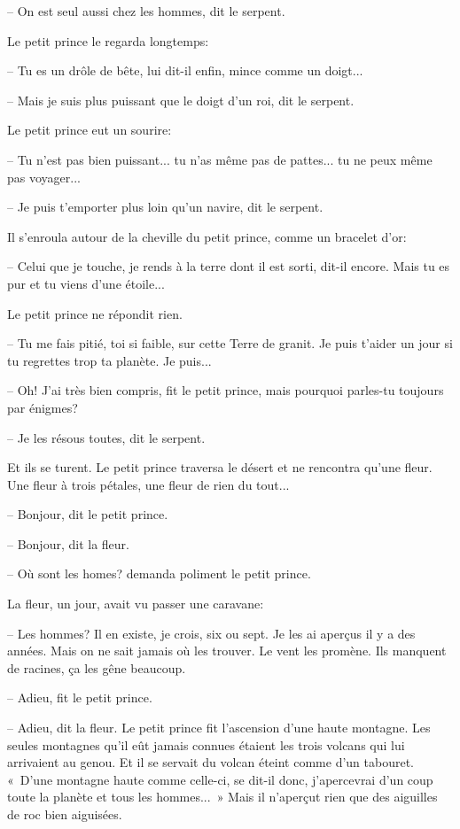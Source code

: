 \documentclass[a4paper]{report}
\begin{document}
-- On est seul aussi chez les hommes, dit le serpent.

Le petit prince le regarda longtemps:


-- Tu es un drôle de bête, lui dit-il enfin, mince comme un doigt...

-- Mais je suis plus puissant que le doigt d'un roi, dit le serpent.

Le petit prince eut un sourire:

-- Tu n'est pas bien puissant... tu n'as même pas de pattes... tu ne peux même pas voyager...

-- Je puis t'emporter plus loin qu'un navire, dit le serpent.

Il s'enroula autour de la cheville du petit prince, comme un bracelet d'or:

-- Celui que je touche, je rends à la terre dont il est sorti, dit-il encore. Mais tu es pur et tu viens d'une étoile...

Le petit prince ne répondit rien.

-- Tu me fais pitié, toi si faible, sur cette Terre de granit. Je puis t'aider un jour si tu regrettes trop ta planète. Je puis...

-- Oh! J'ai très bien compris, fit le petit prince, mais pourquoi parles-tu toujours par énigmes?

-- Je les résous toutes, dit le serpent.

Et ils se turent.
\parachapter{} %
Le petit prince traversa le désert et ne rencontra qu'une fleur. Une fleur à trois pétales, une fleur de rien du tout...


-- Bonjour, dit le petit prince.

-- Bonjour, dit la fleur.

-- Où sont les homes? demanda poliment le petit prince.

La fleur, un jour, avait vu passer une caravane:

-- Les hommes? Il en existe, je crois, six ou sept. Je les ai aperçus il y a des années. Mais on ne sait jamais où les trouver. Le vent les promène. Ils manquent de racines, ça les gêne beaucoup.

-- Adieu, fit le petit prince.

-- Adieu, dit la fleur.
\parachapter{} %
Le petit prince fit l'ascension d'une haute montagne. Les seules montagnes qu'il eût jamais connues étaient les trois volcans qui lui arrivaient au genou. Et il se servait du volcan éteint comme d'un tabouret. «~D'une montagne haute comme celle-ci, se dit-il donc, j'apercevrai d'un coup toute la planète et tous les hommes...~» Mais il n'aperçut rien que des aiguilles de roc bien aiguisées.
\end{document}
